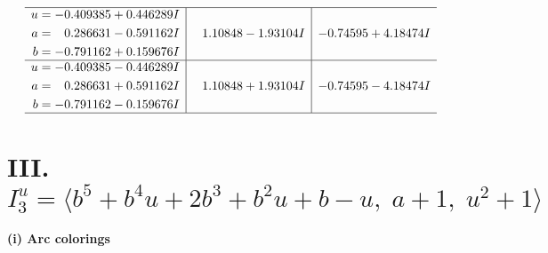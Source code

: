 \documentclass[1p]{elsarticle_modified}
\theoremstyle{definition}
\begin{document}
$$\begin{array}{c|c|c}
 \hline 
\begin{aligned}
u &= -0.409385 + 0.446289 I \\
a &= \phantom{-}0.286631 - 0.591162 I \\
b &= -0.791162 + 0.159676 I\end{aligned}
 & \phantom{-}1.10848 - 1.93104 I & -0.74595 + 4.18474 I \\ \hline\begin{aligned}
u &= -0.409385 - 0.446289 I \\
a &= \phantom{-}0.286631 + 0.591162 I \\
b &= -0.791162 - 0.159676 I\end{aligned}
 & \phantom{-}1.10848 + 1.93104 I & -0.74595 - 4.18474 I\\
 \hline 
 \end{array}$$\newpage\newpage\renewcommand{\arraystretch}{1}
\centering \section*{III. $I^u_{3}= \langle b^5+b^4 u+2 b^3+b^2 u+b- u,\;a+1,\;u^2+1 \rangle$}
\flushleft \textbf{(i) Arc colorings}\\
\end{document}
